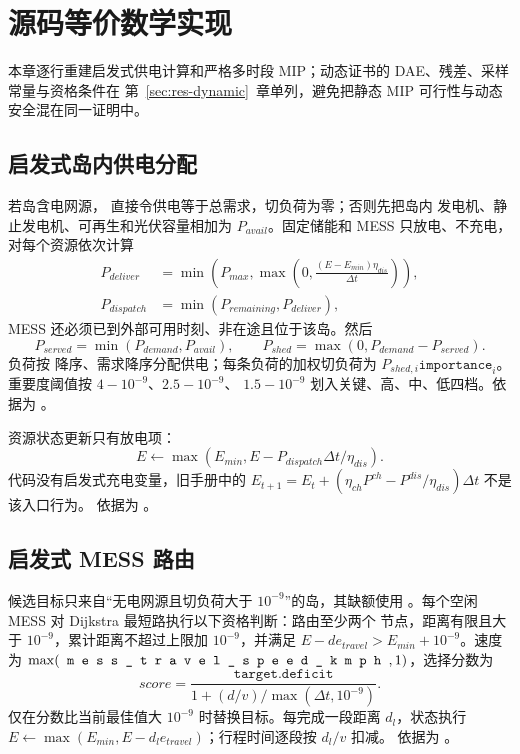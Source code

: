 \section{源码等价数学实现}\label{sec:res-source-model}

本章逐行重建启发式供电计算和严格多时段 MIP；动态证书的 DAE、残差、采样常量与资格条件在
第~\ref{sec:res-dynamic}~章单列，避免把静态 MIP 可行性与动态安全混在同一证明中。

\subsection{启发式岛内供电分配}

若岛含电网源， 直接令供电等于总需求，切负荷为零；否则先把岛内
发电机、静止发电机、可再生和光伏容量相加为 $P_{avail}$。固定储能和 MESS 只放电、不充电，
对每个资源依次计算
\begin{align}
 P_{deliver}&=\min\!\left(P_{max},
 \max\!\left(0,\frac{(E-E_{min})\eta_{dis}}{\Delta t}\right)\right),\\
 P_{dispatch}&=\min(P_{remaining},P_{deliver}),
\end{align}
MESS 还必须已到外部可用时刻、非在途且位于该岛。然后
\begin{equation}
 P_{served}=\min(P_{demand},P_{avail}),\qquad
 P_{shed}=\max(0,P_{demand}-P_{served}).
\end{equation}
负荷按  降序、需求降序分配供电；每条负荷的加权切负荷为
$P_{shed,i}\texttt{importance}_i$。重要度阈值按 $4-10^{-9}$、$2.5-10^{-9}$、
$1.5-10^{-9}$ 划入关键、高、中、低四档。依据为
。

资源状态更新只有放电项：
\begin{equation}
 E\leftarrow\max(E_{min},E-P_{dispatch}\Delta t/\eta_{dis}).
\end{equation}
代码没有启发式充电变量，旧手册中的
$E_{t+1}=E_t+(\eta_{ch}P^{ch}-P^{dis}/\eta_{dis})\Delta t$ 不是该入口行为。
依据为 。

\subsection{启发式 MESS 路由}

候选目标只来自“无电网源且切负荷大于 $10^{-9}$”的岛，其缺额使用
。每个空闲 MESS 对 Dijkstra 最短路执行以下资格判断：路由至少两个
节点，距离有限且大于 $10^{-9}$，累计距离不超过上限加 $10^{-9}$，并满足
$E-d e_{travel}>E_{min}+10^{-9}$。速度为
$\max(\fld{mess\_travel\_speed\_kmph},1)$，选择分数为
\begin{equation}
 score=\frac{\texttt{target.deficit}}
 {1+(d/v)/\max(\Delta t,10^{-9})}.
\end{equation}
仅在分数比当前最佳值大 $10^{-9}$ 时替换目标。每完成一段距离 $d_l$，状态执行
$E\leftarrow\max(E_{min},E-d_le_{travel})$；行程时间逐段按 $d_l/v$ 扣减。
依据为 。

